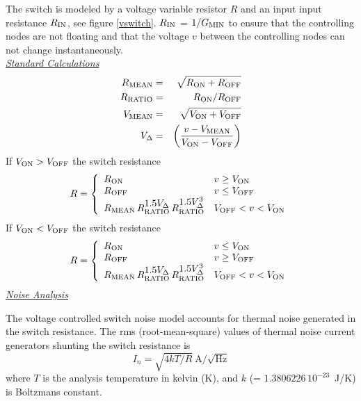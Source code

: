 The switch is modeled by a voltage variable resistor $R$ and an input
input resistance $R_{\mbox{\scriptsize IN}}$, see figure \ref{vswitch}.
$R_{\mbox{\scriptsize IN}}$ = $1/G_{\mbox{\scriptsize MIN}}$ to ensure that the
controlling nodes are not floating and that the voltage $v$ between the
controlling nodes can not change instantaneously.
\\[0.1in]

\noindent\underline{\sl \large Standard Calculations}\\[0.1in]
\begin{eqnarray}
R_{\mbox{\scriptsize MEAN}} & = & \sqrt{R_{\mbox{\scriptsize ON}} + R_{\mbox{\scriptsize OFF}}} \\
R_{\mbox{\scriptsize RATIO}}& = &       R_{\mbox{\scriptsize ON}}/ R_{\mbox{\scriptsize OFF}} \\
V_{\mbox{\scriptsize MEAN}} & = & \sqrt{V_{\mbox{\scriptsize ON}} + V_{\mbox{\scriptsize OFF}}} \\
V_{\Delta}& = & \left({{\textstyle v - V_{\mbox{\scriptsize MEAN}}} \over
              {\textstyle V_{\mbox{\scriptsize ON}}- V_{\mbox{\scriptsize OFF}}}}\right)
\end{eqnarray}
If $V_{\mbox{\scriptsize ON}}> V_{\mbox{\scriptsize OFF}}$
the switch resistance
\begin{equation}
R = \left\{
\begin{array}{ll}
R_{\ms{ON}}                            & v \ge V_{\ms{ON}} \\
R_{\ms{OFF}}                            & v \le V_{\ms{OFF}}\\
R_{\ms{MEAN}}\,
  R_{\ms{RATIO}}^{\textstyle 1.5 V_{\Delta}}\,
  R_{\ms{RATIO}}^{\textstyle 1.5 V_{\Delta}^3}
  & V_{\ms{OFF}} < v < V_{\ms{ON}} \\
\end{array} \right. %
\end{equation}
If $V_{\mbox{\scriptsize ON}}< V_{\mbox{\scriptsize OFF}}$
the switch resistance
\begin{equation}
R = \left\{
\begin{array}{ll}
R_{\ms{ON}}                            & v \le V_{\ms{ON}} \\
R_{\ms{OFF}}                            & v \ge V_{\ms{OFF}}\\
R_{\ms{MEAN}}\,
  R_{\ms{RATIO}}^{\textstyle 1.5 V_{\Delta}}\,
  R_{\ms{RATIO}}^{\textstyle 1.5 V_{\Delta}^3}
  & V_{\ms{OFF}} < v < V_{\ms{ON}} \\
\end{array} \right. %
\end{equation}
\noindent\underline{\sl \large Noise Analysis}\\[0.1in]

The voltage controlled switch noise model accounts for thermal noise generated
in the switch resistance.
The rms (root-mean-square) values of
thermal noise current generators shunting the switch resistance is
\begin{equation}
I_{n} = \sqrt{4kT/R}~\mbox{A/}\sqrt{\mbox{Hz}}
\end{equation}
where $T$ is the analysis temperature in kelvin (K), and $k$ (=
$1.3806226\,10^{-23}$~J/K) is Boltzmans constant.
